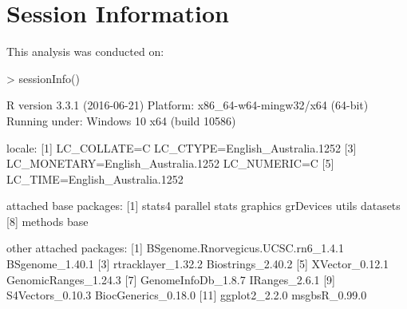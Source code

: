 \documentclass{article}
\begin{document}
\section{Session Information}
This analysis was conducted on:
\begin{Schunk}
\begin{Sinput}
> sessionInfo()
\end{Sinput}
\begin{Soutput}
R version 3.3.1 (2016-06-21)
Platform: x86_64-w64-mingw32/x64 (64-bit)
Running under: Windows 10 x64 (build 10586)

locale:
[1] LC_COLLATE=C                       LC_CTYPE=English_Australia.1252   
[3] LC_MONETARY=English_Australia.1252 LC_NUMERIC=C                      
[5] LC_TIME=English_Australia.1252    

attached base packages:
[1] stats4    parallel  stats     graphics  grDevices utils     datasets 
[8] methods   base     

other attached packages:
 [1] BSgenome.Rnorvegicus.UCSC.rn6_1.4.1 BSgenome_1.40.1                    
 [3] rtracklayer_1.32.2                  Biostrings_2.40.2                  
 [5] XVector_0.12.1                      GenomicRanges_1.24.3               
 [7] GenomeInfoDb_1.8.7                  IRanges_2.6.1                      
 [9] S4Vectors_0.10.3                    BiocGenerics_0.18.0                
[11] ggplot2_2.2.0                       msgbsR_0.99.0                      


\end{Soutput}
\end{Schunk}
\end{document}
